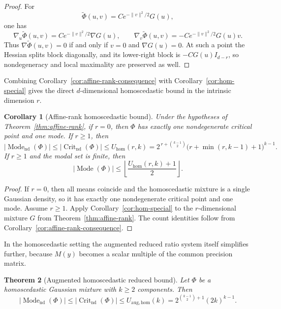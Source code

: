 \documentclass[11pt]{article}
\theoremstyle{plain}
\newtheorem{theorem}{Theorem}[section]
\newtheorem{corollary}[theorem]{Corollary}
\theoremstyle{definition}
\theoremstyle{remark}
\numberwithin{equation}{section}
\DeclareMathOperator{\Crit}{Crit}
\DeclareMathOperator{\Mode}{Mode}
\begin{document}
\begin{proof}
For
\[
\widetilde \Phi(u,v)=C e^{-\|v\|^2/2}G(u),
\]
one has
\[
\nabla_u\widetilde \Phi(u,v)=Ce^{-\|v\|^2/2}\nabla G(u),
\qquad
\nabla_v\widetilde \Phi(u,v)=-Ce^{-\|v\|^2/2}G(u)v.
\]
Thus $\nabla\widetilde \Phi(u,v)=0$ if and only if $v=0$ and $\nabla G(u)=0$. At such a point the Hessian splits block diagonally, and its lower-right block is $-CG(u)I_{d-r}$, so nondegeneracy and local maximality are preserved as well.
\end{proof}

Combining Corollary~\ref{cor:affine-rank-consequence} with Corollary~\ref{cor:hom-special} gives the direct $d$-dimensional homoscedastic bound in the intrinsic dimension $r$.

\begin{corollary}[Affine-rank homoscedastic bound]\label{cor:affine-rank-bound}
Under the hypotheses of Theorem~\ref{thm:affine-rank}, if $r=0$, then $\Phi$ has exactly one nondegenerate critical point and one mode. If $r\ge1$, then
\[
|\Mode_{\mathrm{nd}}(\Phi)|\le |\Crit_{\mathrm{nd}}(\Phi)|\le U_{\mathrm{hom}}(r,k)=2^{\,r+\binom{k-1}{2}}\bigl(r+\min(r,k-1)+1\bigr)^{k-1}.
\]
If $r\ge1$ and the modal set is finite, then
\[
|\Mode(\Phi)|\le \left\lfloor\frac{U_{\mathrm{hom}}(r,k)+1}{2}\right\rfloor.
\]
\end{corollary}

\begin{proof}
If $r=0$, then all means coincide and the homoscedastic mixture is a single Gaussian density, so it has exactly one nondegenerate critical point and one mode. Assume $r\ge1$. Apply Corollary~\ref{cor:hom-special} to the $r$-dimensional mixture $G$ from Theorem~\ref{thm:affine-rank}. The count identities follow from Corollary~\ref{cor:affine-rank-consequence}.
\end{proof}

In the homoscedastic setting the augmented reduced ratio system itself simplifies further, because $M(y)$ becomes a scalar multiple of the common precision matrix.

\begin{theorem}[Augmented homoscedastic reduced bound]\label{thm:hom-augmented-bound}
Let $\Phi$ be a homoscedastic Gaussian mixture with $k\ge 2$ components. Then
\[
|\Mode_{\mathrm{nd}}(\Phi)|\le |\Crit_{\mathrm{nd}}(\Phi)|\le
U_{\mathrm{aug,hom}}(k)=2^{\binom{k-1}{2}+1}(2k)^{k-1}.
\]
\end{theorem}
\end{document}
